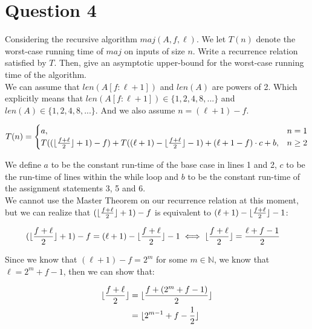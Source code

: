 \documentclass[20pt]{article}
\DeclarePairedDelimiter\floor{\lfloor}{\rfloor}
\begin{document}
\section*{Question 4}

\begin{text}
    Considering the recursive algorithm $maj(A, f, \ell)$. We let $T(n)$ denote the worst-case running time of $maj$ on inputs of size $n$. Write a recurrence relation satisfied by $T$. Then, give an asymptotic upper-bound for the worst-case running time of the algorithm.\\
    
    \noindent
    We can assume that $len(A[f : \ell + 1])$ and $len(A)$ are powers of 2. Which explicitly means that $len(A[f : \ell + 1]) \in \{1, 2, 4, 8, ...\}$ and $len(A) \in \{1, 2, 4, 8, ...\}$. And we also assume $n = (\ell + 1) - f$.
\end{text}

\begin{equation}
    T(n) = 
    \begin{cases}
      a, & n = 1 \nonumber\\
      T((\floor{\frac{f + \ell}{2}} + 1) - f) + T((\ell + 1) - \floor{\frac{f + \ell}{2}} - 1) + (\ell + 1 - f) \cdot c + b, & n\geq 2\nonumber
    \end{cases}
\end{equation}

\noindent
\begin{text}
    We define $a$ to be the constant run-time of the base case in lines 1 and 2, $c$ to be the run-time of lines within the while loop and $b$ to be the constant run-time of the assignment statements 3, 5 and 6.\\

    \noindent
    We cannot use the Master Theorem on our recurrence relation at this moment, but we can realize that $(\floor{\frac{f + \ell}{2}} + 1) - f$ is equivalent to $(\ell + 1) - \floor{\frac{f + \ell}{2}} - 1$:
\end{text}

\begin{align}
    (\floor{\frac{f + \ell}{2}} + 1) - f = (\ell + 1) - \floor{\frac{f + \ell}{2}} - 1 &\iff \floor{\frac{f + \ell}{2}} = \frac{\ell + f - 1}{2}\nonumber
\end{align}

\noindent
\begin{text}
    Since we know that $(\ell + 1) - f = 2^m$ for some $m \in \mathbb{N}$, we know that $\ell = 2^m + f - 1$, then we can show that:
\end{text}
\begin{align}
    \floor{\frac{f + \ell}{2}} &= \floor{\frac{f + (2^m + f - 1)}{2}}\nonumber\\
    &= \floor{2^{m-1} + f - \frac{1}{2}}\nonumber
\end{align}
\end{document}
